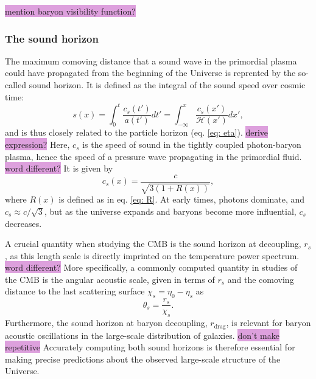 \documentclass{aa}
\numberwithin{equation}{section}
\numberwithin{table}{section}
\numberwithin{figure}{section}
\begin{document}
\colorbox{Plum}{mention baryon visibility function?}




\subsubsection{The sound horizon}\label{subsubsec: II theory sound}
The maximum comoving distance that a sound wave in the primordial plasma could have propagated from the beginning of the Universe is reprented by the so-called sound horizon. It is defined as the integral of the sound speed over cosmic time:
\begin{equation}
s(x) = \int_0^t \frac{c_s(t')}{a(t')} dt' = \int_{-\infty}^x \frac{c_s(x')}{\mathcal{H}(x')} dx',
\end{equation}
and is thus closely related to the particle horizon (eq. \eqref{eq: eta}). \colorbox{Plum}{derive expression?} Here, $c_s$ is the speed of sound in the tightly coupled photon-baryon plasma, hence the speed of a pressure wave propagating in the primordial fluid. \colorbox{Plum}{word different?} It is given by
\begin{equation}
c_s(x) = \frac{c}{\sqrt{3(1 + R(x))}},
\end{equation}
where $R(x)$ is defined as in eq. \eqref{eq: R}. At early times, photons dominate, and $c_s \approx c/\sqrt{3}$, but as the universe expands and baryons become more influential, $c_s$ decreases.

A crucial quantity when studying the CMB is the sound horizon at decoupling, $r_s$, as this length scale is directly imprinted on the temperature power spectrum. \colorbox{Plum}{word different?}
More specifically, a commonly computed quantity in studies of the CMB is the angular acoustic scale, given in terms of $r_s$ and the comoving distance to the last scattering surface $\chi_s=\eta_0-\eta_s$ as
\begin{equation}
  \theta_s = \frac{r_s}{\chi_s}.
\end{equation}
Furthermore, the sound horizon at baryon decoupling, $r_\text{drag}$, is relevant for baryon acoustic oscillations in the large-scale distribution of galaxies. \colorbox{Plum}{don't make repetitive} Accurately computing both sound horizons is therefore essential for making precise predictions about the observed large-scale structure of the Universe.


\end{document}
